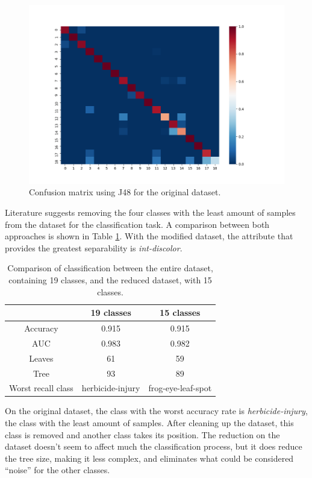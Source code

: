 \documentclass{article}
\begin{document}
\begin{figure}[htp]
    \centering
    \includegraphics[scale=0.6]{confusion_matrix.png}
    \caption{Confusion matrix using J48 for the original dataset.}
    \label{fig:confusion_matrix}
\end{figure}

Literature suggests removing the four classes with the least amount of samples from the dataset for the classification task. A comparison between both approaches is shown in Table \ref{tab:comparison}. With the modified dataset, the attribute that provides the greatest separability is \textit{int-discolor}. 

\begin{table}[htp]
    \centering
    \begin{tabular}{c|c|c}
         & 19 classes & 15 classes \\ \hline
         Accuracy & 0.915 & 0.915 \\
         AUC &  0.983 & 0.982 \\
         Leaves & 61 & 59 \\
         Tree & 93 & 89 \\
         Worst recall class & herbicide-injury & frog-eye-leaf-spot \\
    \end{tabular}
    \caption{Comparison of classification between the entire dataset, containing 19 classes, and the reduced dataset, with 15 classes.}
    \label{tab:comparison}
\end{table}

On the original dataset, the class with the worst accuracy rate is \textit{herbicide-injury}, the class with the least amount of samples. After cleaning up the dataset, this class is removed and another class takes its position. The reduction on the dataset doesn't seem to affect much the classification process, but it does reduce the tree size, making it less complex, and eliminates what could be considered ``noise'' for the other classes.
\end{document}
